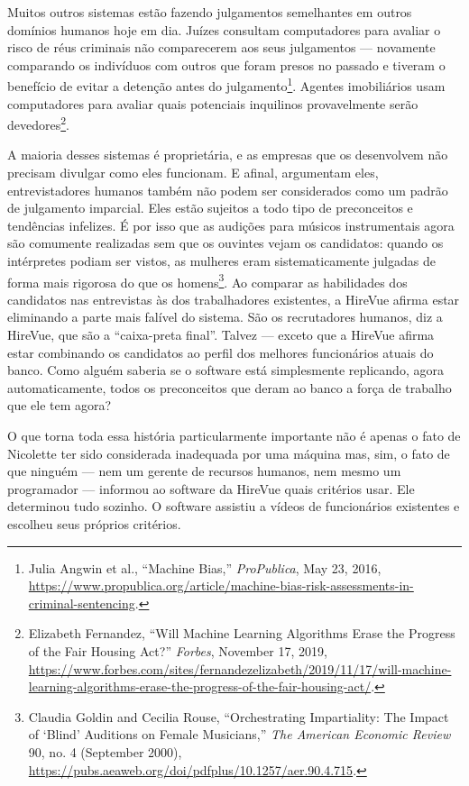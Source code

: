 Muitos outros sistemas estão fazendo julgamentos semelhantes em outros domínios
humanos hoje em dia. Juízes consultam computadores para avaliar o risco de réus 
criminais não comparecerem aos seus julgamentos --- novamente comparando os 
indivíduos com outros que foram presos no passado e tiveram o benefício de 
evitar a detenção antes do julgamento\footnote{Julia Angwin et al., ``Machine
Bias,'' \textit{ProPublica}, May 23, 2016,
\url{https://www.propublica.org/article/machine-bias-risk-assessments-in-criminal-sentencing}.}. Agentes
imobiliários usam computadores para avaliar quais potenciais inquilinos
provavelmente serão devedores\footnote{Elizabeth Fernandez, ``Will Machine
Learning Algorithms Erase the Progress of the Fair Housing Act?''
\textit{Forbes}, November 17, 2019,
\url{https://www.forbes.com/sites/fernandezelizabeth/2019/11/17/will-machine-learning-algorithms-erase-the-progress-of-the-fair-housing-act/}.}.

A maioria desses sistemas é proprietária, e as empresas que os desenvolvem não 
precisam divulgar como eles funcionam. E afinal, argumentam eles,
entrevistadores humanos também não podem ser considerados como um padrão de
julgamento imparcial. Eles estão sujeitos a todo tipo de preconceitos e
tendências infelizes. É por isso que as audições para músicos instrumentais
agora são comumente realizadas sem que os ouvintes vejam os candidatos: quando
os intérpretes podiam ser vistos, as mulheres eram sistematicamente julgadas de
forma mais rigorosa do que os homens\footnote{Claudia Goldin and Cecilia Rouse,
``Orchestrating Impartiality: The Impact of `Blind' Auditions on Female
Musicians,'' \textit{The American Economic Review} 90, no. 4 (September 2000),
\url{https://pubs.aeaweb.org/doi/pdfplus/10.1257/aer.90.4.715}.}. Ao comparar as
habilidades dos candidatos nas entrevistas às dos trabalhadores existentes, a
HireVue afirma estar eliminando a parte mais falível do sistema. São os
recrutadores humanos, diz a HireVue, que são a ``caixa-preta final''. Talvez ---
exceto que a HireVue afirma estar combinando os candidatos ao perfil dos
melhores funcionários atuais do banco. Como alguém saberia se o software está
simplesmente replicando, agora automaticamente, todos os preconceitos que deram
ao banco a força de trabalho que ele tem agora?

O que torna toda essa história particularmente importante não é apenas o fato de
Nicolette ter sido considerada inadequada por uma máquina mas, sim, o fato de
que ninguém --- nem um gerente de recursos humanos, nem mesmo um programador ---
informou ao software da HireVue quais critérios usar. Ele determinou tudo
sozinho. O software assistiu a vídeos de funcionários existentes e escolheu seus
próprios critérios.

